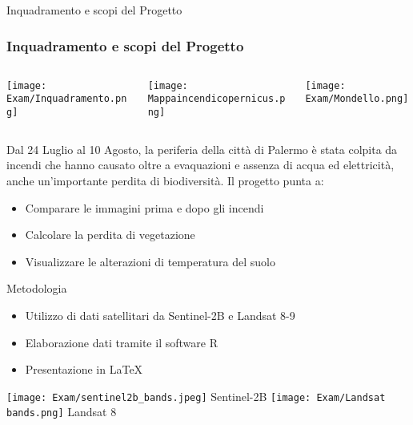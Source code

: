 \documentclass{beamer}  %
\begin{document}
\begin{frame}{Inquadramento e scopi del Progetto}
\frametitle{Inquadramento e scopi del Progetto}
\vspace{0.5cm}
\begin{columns}
  \begin{column}{0.20\textwidth} %
    \centering
    \texttt{[image: Exam/Inquadramento.png]} %
  \end{column}
  \begin{column}{0.34\textwidth} %
    \centering
    \texttt{[image: Mappaincendicopernicus.png]} %
  \end{column}
  \begin{column}{0.39\textwidth}  %
    \centering
    \texttt{[image: Exam/Mondello.png]} %
  \end{column} 
\end{columns} %
\vspace{0.5cm}
\small %
Dal 24 Luglio al 10 Agosto, la periferia della città di Palermo è stata colpita da incendi che hanno causato oltre a evaquazioni e assenza di acqua ed elettricità, anche un'importante perdita di biodiversità. Il progetto punta a:
\vspace{0.2cm}
\begin{itemize}
    \item Comparare le immagini prima e dopo gli incendi
    \item Calcolare la perdita di vegetazione
    \item Visualizzare le alterazioni di temperatura del suolo 
\end{itemize}
\end{frame}

\begin{frame}{Metodologia}
    \begin{itemize}
        \item Utilizzo di dati satellitari da Sentinel-2B e Landsat 8-9 
        \item Elaborazione dati tramite il software R
        \item Presentazione in \LaTeX
    \end{itemize}
    \vspace{0.5cm}
    \centering
    \texttt{[image: Exam/sentinel2b\_bands.jpeg]}
    {\tiny Sentinel-2B}
    \vspace{0.2cm}
    \texttt{[image: Exam/Landsat bands.png]}
    {\tiny Landsat 8}
\end{frame}
\end{document}

